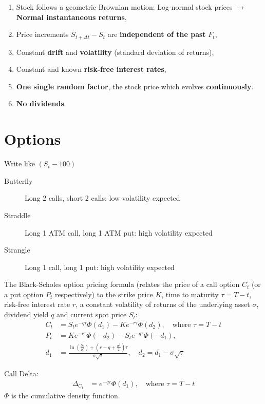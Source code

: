 \documentclass[a4paper, DIV19,12pt]{scrartcl}
\newcommand{\bparens}  [1]{\left(       #1 \right)      } %
\begin{document}
\begin{enumerate}
\item Stock follows a geometric Brownian motion: Log-normal stock prices $\rightarrow$ \textbf{Normal instantaneous returns},
\item Price increments $S_{t+\Delta t} - S_t$ are \textbf{independent of the past} $F_t$,
\item Constant \textbf{drift} and \textbf{volatility} (standard deviation of returns),
\item Constant and known \textbf{risk-free interest rates},
\item \textbf{One single random factor}, the stock price which evolves \textbf{continuously}.
\item \textbf{No dividends}.
\end{enumerate}

\section{Options}

Write like $\left(S_t - 100\right)$

\begin{description}
\item[Butterfly] Long 2 calls, short 2 calls: low volatility expected
\item[Straddle] Long 1 ATM call, long 1 ATM put: high volatility expected
\item[Strangle] Long 1 call, long 1 put: high volatility expected
\end{description}

The Black-Scholes option pricing formula (relates the price of a call option $C_t$ (or a put option $P_t$ respectively)
to the strike price $K$, time to maturity $\tau = T - t$, risk-free interest rate $r$, a constant volatility of returns of the underlying asset 
$\sigma$, dividend yield $q$ and current spot price $S_t$:
\begin{align}
C_t &= S_t e^{-q\tau}\Phi\bparens{d_1} - K e^{-r\tau}\Phi\bparens{d_2}, \quad \text{where } \tau = T - t\\
P_t &= K e^{-r\tau}\Phi\bparens{-d_2} - S_t e^{-q\tau}\Phi\bparens{-d_1},\\
d_1 &= \frac{\ln\bparens{\frac{S_t}{K}} + \bparens{r - q + \frac{\sigma^2}{2}}\tau}{\sigma \sqrt{\tau}}, \quad d_2 = d_1 - \sigma \sqrt{\tau}
\end{align}

Call Delta:
\begin{align}
\Delta_{C_t} &= e^{-q\tau}\Phi\bparens{d_1}, \quad \text{where } \tau = T - t
\end{align}
$\Phi$ is the cumulative density function.
\end{document}

